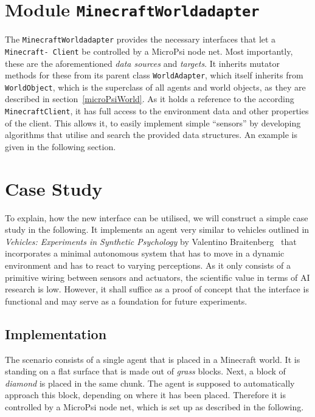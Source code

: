     \section{Module \texttt{MinecraftWorldadapter}}

The \texttt{MinecraftWorldadapter} provides the necessary interfaces that let a \texttt{Minecraft- Client} be controlled by a MicroPsi node net. Most importantly, these are the aforementioned \emph{data sources} and \emph{targets}. It inherits mutator methods for these from its parent class \texttt{WorldAdapter}, which itself inherits from \texttt{WorldObject}, which is the superclass of all agents and world objects, as they are described in section~\ref{microPsiWorld}. As it holds a reference to the according \texttt{MinecraftClient}, it has full access to the environment data and other properties of the client. This allows it, to easily implement simple ``sensors'' by developing algorithms that utilise and search the provided data structures. An example is given in the following section.
    
    \section{Case Study}
    \label{case_study}

To explain, how the new interface can be utilised, we will construct a simple case study in the following. It implements an agent very similar to vehicles outlined in \emph{Vehicles: Experiments in Synthetic Psychology} by Valentino Braitenberg~\cite{citeulike:941238} that incorporates a minimal autonomous system that has to move in a dynamic environment and has to react to varying perceptions. As it only consists of a primitive wiring between sensors and actuators, the scientific value in terms of AI research is low. However, it shall suffice as a proof of concept that the interface is functional and may serve as a foundation for future experiments.

        \subsection{Implementation}

The scenario consists of a single agent that is placed in a Minecraft world. It is standing on a flat surface that is made out of \emph{grass} blocks. Next, a block of \emph{diamond} is placed in the same chunk. The agent is supposed to automatically approach this block, depending on where it has been placed. Therefore it is controlled by a MicroPsi node net, which is set up as described in the following.

